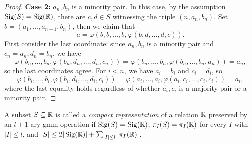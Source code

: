 \documentclass[letterpaper,11pt]{article}
\DeclareMathOperator{\Sig}{Sig}
\begin{document}
\begin{proof}
{\bf Case 2: }$a_n,b_n$ is a minority pair. In this case, by the assumption $\Sig(S) = \Sig(\RR)$, there are $c,d \in S$ witnessing the triple $(n,a_n,b_n)$. Set $b = (a_1, ..., a_{n-1}, b_n)$, then we claim that
\[
a = \varphi(b,b,...,b,\varphi(b,d,...,d,c)).
\]
First consider the last coordinate: since $a_n,b_n$ is a minority pair and $c_n = a_n, d_n = b_n$, we have
\[
\varphi(b_n, ..., b_n,\varphi(b_n,d_n,...,d_n,c_n)) = \varphi(b_n, ..., b_n, \varphi(b_n, ..., b_n, a_n)) = a_n,
\]
so the last coordinates agree. For $i < n$, we have $a_i = b_i$ and $c_i = d_i$, so
\[
\varphi(b_i, ..., b_i,\varphi(b_i,d_i,...,d_i,c_i)) = \varphi(a_i, ..., a_i,\varphi(a_i,c_i,...,c_i,c_i)) = a_i,
\]
where the last equality holds regardless of whether $a_i,c_i$ is a majority pair or a minority pair.
\end{proof}

\begin{defn} A subset $S \subseteq \mathbb{R}$ is called a \emph{compact representation} of a relation $\mathbb{R}$ preserved by an $l+1$-ary gmm operation if $\Sig(S) = \Sig(\RR)$, $\pi_I(S) = \pi_I(\mathbb{R})$ for every $I$ with $|I| \le l$, and $|S| \le 2|\Sig(\RR)| + \sum_{|I| \le l} |\pi_I(\RR)|$.
\end{defn}
\end{document}
